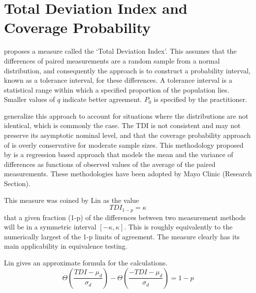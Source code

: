 \documentclass[12pt, a4paper]{report}
\theoremstyle{plain}
\theoremstyle{definition}
\theoremstyle{remark}
\begin{document}
		



	\section{Total Deviation Index and Coverage Probability}
	
	
	\citet{lin2002} proposes a measure called the `Total Deviation Index'. 
	This assumes that the differences of paired measurements are a random sample from a normal distribution, 
	and consequently the approach is to construct a probability interval, known as a tolerance interval, 
	for these differences. A tolerance interval is a statistical range within which a specified proportion 
	of the population lies.
	Smaller values of $q$ indicate better agreement. $P_{0}$ is specified by the practitioner.
	
	\citet{pkcng} generalize this approach to account for situations where the distributions are not identical, which is commonly the case.
	The TDI is not consistent and may not preserve its asymptotic nominal level, and that the coverage probability approach of \citet{lin2002} is overly conservative for moderate sample sizes.
	This methodology proposed by \citet{pkcng} is a regression based approach that models the mean and the variance of differences as functions of observed values of the average of the paired measurements.
	These methodologies have been adopted by Mayo Clinic (Research Section).
	
	
	This measure was coined by Lin as the value \[TDI_{1-p} = \kappa\] that a given fraction (1-p) of the differences between two measurement methods will be in a symmetric interval $[-\kappa,\kappa]$.
	This is roughly equivalently to the numerically largest of the 1-p limits of agreement.
	The measure clearly has its main applicability in equivalence testing. 
	
	Lin gives an approximate formula for the calculations.
	\[\Theta \left( \frac{ TDI - \mu_d}{\sigma_d} \right) - \Theta \left(  \frac{ -TDI - \mu_d}{\sigma_d} \right) = 1-p\]
	
\end{document}

